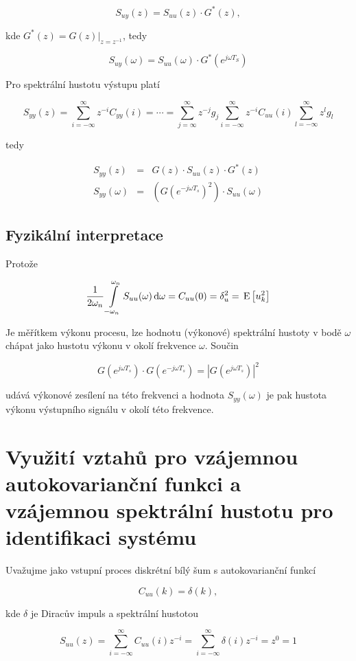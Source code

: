 \[ S_{uy}(z) = S_{uu}(z)\cdot G^*(z), \]

kde $G^*(z)=G(z)|_{z=z^{-1}}$, tedy

\[ S_{uy}(\omega) = S_{uu}(\omega)\cdot G^*\left(e^{j\omega T_S}\right)  \]

Pro spektrální hustotu výstupu platí

\[ S_{yy}(z) = \sum_{i=-\infty}^\infty z^{-i}C_{yy}(i) = \cdots = \sum_{j=\infty}^\infty z^{-j}g_j \sum_{i=-\infty}^\infty z^{-i} C_{uu}(i)\sum_{l=-\infty}^\infty z^{l}g_l \]

tedy

\begin{eqnarray*}
S_{yy}(z) & = & G(z)\cdot S_{uu}(z)\cdot G^*(z)\\
S_{yy}(\omega) & = & \left(G\left(e^{-j\omega T_s}\right)^2\right)\cdot S_{uu}(\omega)
\end{eqnarray*}

\subsection{Fyzikální interpretace}
Protože

\[ \frac{1}{2\omega_n}\int\limits_{-\omega_n}^{\omega_n}S_{uu}(\omega)\,\mathrm{d}\omega = C_{uu}(0)=\delta_u^2=\,\mathrm{E}\left[u_k^2\right] \]

Je měřítkem výkonu procesu, lze hodnotu (výkonové) spektrální hustoty v bodě $\omega$ chápat jako hustotu výkonu v okolí frekvence $\omega$. Součin

\[ G\left(e^{j\omega T_s}\right)\cdot G\left(e^{-j\omega T_s}\right) = \left|G\left(e^{j\omega T_s}\right)\right|^2 \]

udává výkonové zesílení na této frekvenci a hodnota $S_{yy}(\omega)$ je pak hustota výkonu výstupního signálu v okolí této frekvence.

\section{Využití vztahů pro vzájemnou autokovarianční funkci a vzájemnou spektrální hustotu pro identifikaci systému}

Uvažujme jako vstupní proces diskrétní bílý šum s autokovarianční funkcí

\[ C_{uu}(k) = \delta(k), \]

kde $\delta$ je Diracův impuls a spektrální hustotou

\[ S_{uu}(z) = \sum_{i=-\infty}^\infty C_{uu}(i)z^{-i} = \sum_{i=-\infty}^\infty \delta(i)z^{-i}=z^0=1 \]

